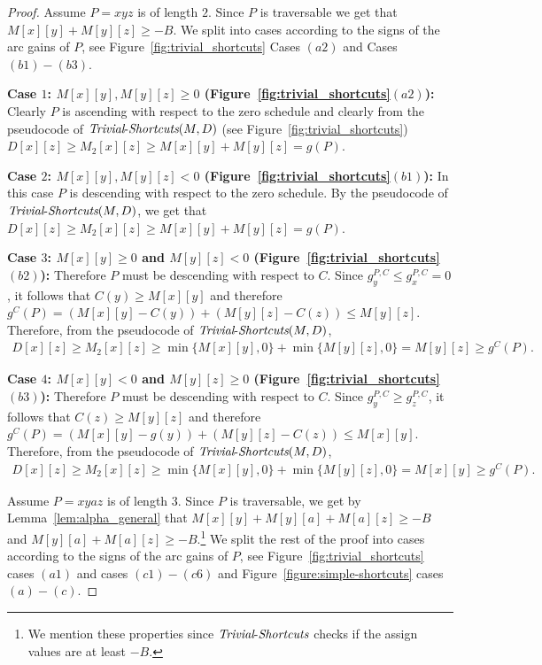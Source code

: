 \documentclass[11pt]{article}
\newcommand{\Trivial}{\mbox{{\it Trivial}-{\it Shortcuts}}}
\begin{document}
\begin{proof}
    Assume $P=xyz$ is of length $2$. Since $P$ is traversable we get that $M[x][y]+M[y][z]\ge -B$. We split into cases according to the signs of the arc gains of $P$, see Figure~\ref{fig:trivial_shortcuts} Cases $(a2)$ and Cases $(b1)-(b3)$.
    
    \textbf{Case $1$: $M[x][y],M[y][z]\ge 0$ (Figure~\ref{fig:trivial_shortcuts}$(a2)$):}  Clearly $P$ is ascending with respect to the zero schedule and clearly from the pseudocode of $\Trivial(M,D)$ (see Figure~\ref{fig:trivial_shortcuts}) $D[x][z] \ge M_2[x][z] \ge M[x][y]+M[y][z]=g(P)$.

    \textbf{Case $2$: $M[x][y],M[y][z]< 0$ (Figure~\ref{fig:trivial_shortcuts}$(b1)$):}
    In this case $P$ is descending with respect to the zero schedule. By the pseudocode of $\Trivial(M,D)$, we get that $D[x][z] \ge M_2[x][z] \ge M[x][y]+M[y][z]=g(P)$.

    \textbf{Case $3$: $M[x][y]\ge0 $ and $M[y][z] < 0$ (Figure~\ref{fig:trivial_shortcuts}$(b2)$):} Therefore $P$ must be descending with respect to $C$. Since $g^{P,C}_y \le g^{P,C}_x=0$, it follows that $C(y)\ge M[x][y]$ and therefore $g^C(P) = (M[x][y]-C(y)) + (M[y][z]-C(z)) \le M[y][z]$. Therefore, from the pseudocode of $\Trivial(M,D)$,
    \begin{align*}
        D[x][z] \ge M_2[x][z] \ge \min\{M[x][y],0\}+\min\{M[y][z],0\} = M[y][z] \ge g^C(P).
    \end{align*}

    \textbf{Case $4$: $M[x][y]< 0 $ and $M[y][z]\ge 0$ (Figure~\ref{fig:trivial_shortcuts}$(b3)$):} 
    Therefore $P$ must be descending with respect to $C$. 
    Since $g^{P,C}_y \ge g^{P,C}_z$, it follows that $C(z)\ge M[y][z]$ and therefore $g^C(P) = (M[x][y]-g(y)) + (M[y][z]-C(z)) \le M[x][y]$. Therefore, from the pseudocode of $\Trivial(M,D)$,
    \begin{align*}
        D[x][z] \ge M_2[x][z]  \ge \min\{M[x][y],0\}+\min\{M[y][z],0\} = M[x][y] \ge g^C(P).
    \end{align*}

    Assume $P=xyaz$ is of length $3$. Since $P$ is traversable, we get by Lemma~\ref{lem:alpha_general} that $M[x][y] + M[y][a] + M[a][z] \ge -B$ and $M[y][a]+M[a][z]\ge -B$.\footnote{We mention these properties since $\Trivial$ checks if the assign values are at least $-B$.} We split the rest of the proof into cases according to the signs of the arc gains of $P$, see Figure~\ref{fig:trivial_shortcuts} cases $(a1)$ and cases $(c1)-(c6)$ and Figure~\ref{figure:simple-shortcuts} cases $(a)-(c)$.


\end{proof}
\end{document}

